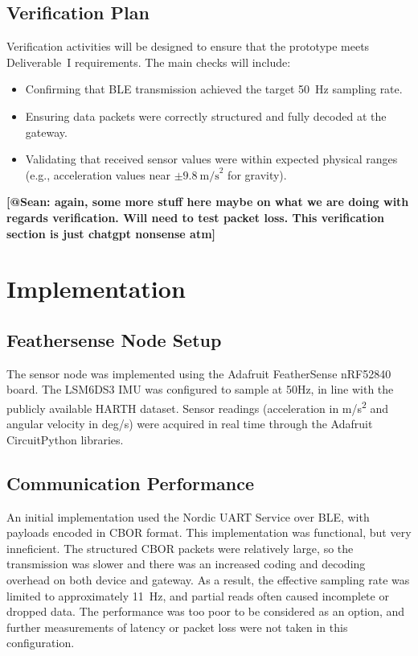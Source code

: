 \documentclass[conference]{IEEEtran}
\begin{document}
\subsection{Verification Plan}
Verification activities will be designed to ensure that the prototype meets Deliverable~I requirements. The main checks will include:
\begin{itemize}
	\item Confirming that BLE transmission achieved the target 50~Hz sampling rate. 
	\item Ensuring data packets were correctly structured and fully decoded at the gateway. 
	\item Validating that received sensor values were within expected physical ranges (e.g., acceleration values near $\pm 9.8~\text{m/s}^2$ for gravity). 
\end{itemize}

\textbf{[@Sean: again, some more stuff here maybe on what we are doing with regards verification. Will need to test packet loss. This verification section is just chatgpt nonsense atm]}

\section{Implementation}
\subsection{Feathersense Node Setup}
The sensor node was implemented using the Adafruit FeatherSense nRF52840 board. The LSM6DS3 IMU was configured to sample at 50Hz, in line with the publicly available HARTH dataset. Sensor readings (acceleration in m/s\textsuperscript{2} and angular velocity in deg/s) were acquired in real time through the Adafruit CircuitPython libraries. 

\subsection{Communication Performance}
An initial implementation used the Nordic UART Service over BLE, with payloads encoded in CBOR format. This implementation was functional, but very inneficient. The structured CBOR packets were relatively large, so the transmission was slower and there was an increased coding and decoding overhead on both device and gateway. As a result, the effective sampling rate was limited to approximately 11~Hz, and partial reads often caused incomplete or dropped data. The performance was too poor to be considered as an option, and further measurements of latency or packet loss were not taken in this configuration. 
\end{document}
